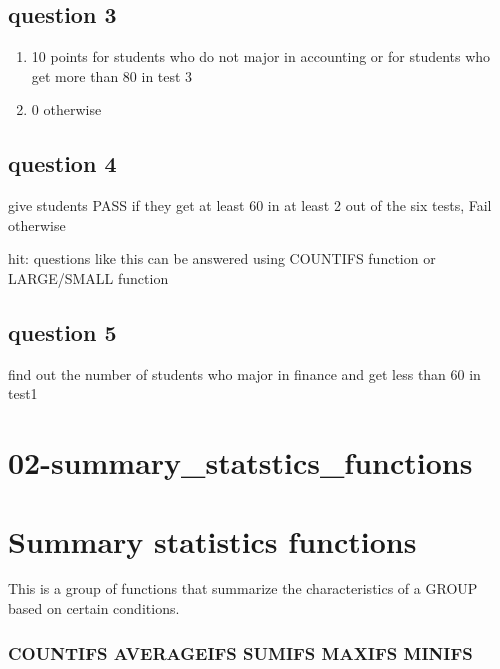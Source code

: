 \documentclass[
  letterpaper,
]{scrbook}
\providecommand{\tightlist}{%
  \setlength{\itemsep}{0pt}\setlength{\parskip}{0pt}}
\begin{document}
\section{question 3}\label{question-3}

\begin{enumerate}
\def\labelenumi{\arabic{enumi}.}
\tightlist
\item
  10 points for students who do not major in accounting or for students
  who get more than 80 in test 3
\item
  0 otherwise
\end{enumerate}

\section{question 4}\label{question-4}

give students PASS if they get at least 60 in at least 2 out of the six
tests, Fail otherwise

hit: questions like this can be answered using COUNTIFS function or
LARGE/SMALL function

\section{question 5}\label{question-5}

find out the number of students who major in finance and get less than
60 in test1


\chapter{02-summary\_statstics\_functions}\label{summary_statstics_functions}


\chapter{Summary statistics
functions}\label{summary-statistics-functions}

This is a group of functions that summarize the characteristics of a
GROUP based on certain conditions.

\subsection{COUNTIFS AVERAGEIFS SUMIFS MAXIFS
MINIFS}\label{countifs-averageifs-sumifs-maxifs-minifs}
\end{document}
